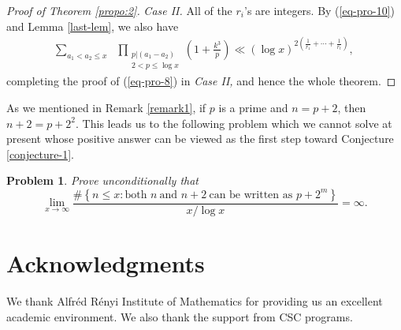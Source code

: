 \documentclass[12pt,a4paper,reqno]{amsart}
\numberwithin{equation}{section}
\theoremstyle{plain}
\newtheorem{problem}{Problem}
\theoremstyle{definition}
\begin{document}
\begin{proof}[Proof of Theorem \ref{propo:2}]
{\it Case II.} All of the $r_i$'s are integers. By (\ref{eq-pro-10}) and Lemma \ref{last-lem}, we also have
\begin{align*}
\sum_{a_1<a_2\le x}&\prod_{\substack{p|(a_1-a_2)\\2<p\le \log x}}\left(1+\frac{k^3}{p}\right)\ll (\log x)^{2\left(\frac{1}{r_1}+\cdots+\frac{1}{r_t}\right)},
\end{align*}
completing the proof of (\ref{eq-pro-8}) in {\it Case II,} and hence the whole theorem.
\end{proof}

As we mentioned in Remark \ref{remark1}, if $p$ is a prime and $n=p+2$, then 
$
n+2=p+2^2.
$
This leads us to the following problem which we cannot solve at present whose positive answer can be viewed as the first step toward Conjecture \ref{conjecture-1}.

\begin{problem}
Prove unconditionally that
$$
\lim_{x\rightarrow\infty}\frac{\#\left\{n\le x: \text{both~} n~\text{and~} n+2 ~\text{can~be~written~as~} p+2^m\right\}}{x/\log x}=\infty.
$$
\end{problem}

\section*{Acknowledgments}
We thank Alfr\'ed R\'enyi Institute of Mathematics for providing us an excellent academic environment. We also thank the support from CSC programs. 
\end{document}
